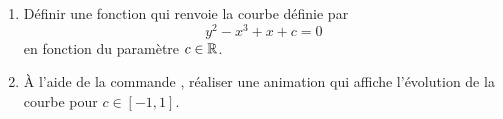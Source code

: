 \begin{frame}[fragile]
\begin{tp}
\begin{enumerate}
  \item Définir une fonction qui renvoie la courbe définie par
  $$y^2-x^3+x+c = 0$$
  en fonction du paramètre $c\in \mathbb{R}$.
  \item \`A l'aide de la commande , 
  réaliser une animation qui affiche l'évolution de la courbe
  pour $c \in[-1,1]$.
\end{enumerate}
\end{tp}


\begin{center}

\end{center}
\end{frame}

